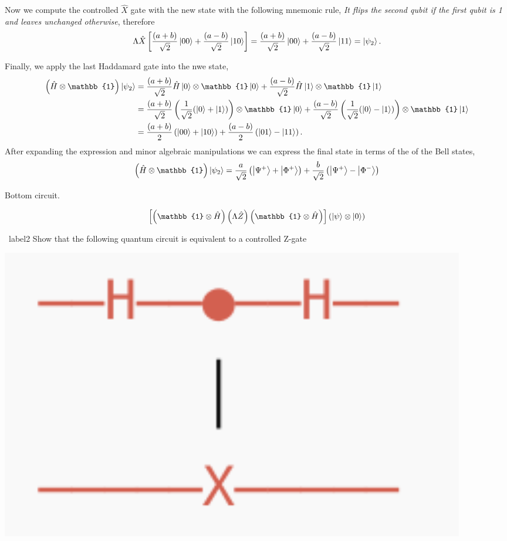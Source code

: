 \documentclass[a4paper]{tufte-handout} %
\begin{document}
Now we compute the controlled $\hat{X}$ gate with the new state with the following mnemonic rule, \textit{It flips the second qubit if the first qubit is \num{1} and leaves unchanged otherwise}, therefore
\begin{gather*}
    \Lambda\hat{X}\left[\frac{\qty(a+b)}{\sqrt{2}}\ket{00}+\frac{\qty(a-b)}{\sqrt{2}}\ket{10}\right] = \frac{\qty(a+b)}{\sqrt{2}}\ket{00}+\frac{\qty(a-b)}{\sqrt{2}}\ket{11}=\ket{\psi_2}.
\end{gather*}

Finally, we apply the last Haddamard gate into the nwe state,
\begin{align*}
    \left(\hat{H}\otimes\mathbb{1}\right)\ket{\psi_2} &=\frac{\qty(a+b)}{\sqrt{2}}\hat{H}\ket{0}\otimes\mathbb{1}\ket{0} + \frac{\qty(a-b)}{\sqrt{2}}\hat{H}\ket{1}\otimes\mathbb{1}\ket{1} \\
                                                      &=\frac{\qty(a+b)}{\sqrt{2}}\left(\frac{1}{\sqrt{2}}\qty(\ket{0}+\ket{1})\right)\otimes\mathbb{1}\ket{0} + \frac{\qty(a-b)}{\sqrt{2}}\left(\frac{1}{\sqrt{2}}\qty(\ket{0}-\ket{1})\right)\otimes\mathbb{1}\ket{1} \\
                                                      &=\frac{\qty(a+b)}{2}\left(\ket{00}+\ket{10}\right) + \frac{\qty(a-b)}{2}\left(\ket{01}-\ket{11}\right).
\end{align*}
After expanding the expression and minor algebraic manipulations we can express the final state in terms of the of the Bell states,
\begin{gather*}
    \left(\hat{H}\otimes\mathbb{1}\right)\ket{\psi_2}=\frac{a}{\sqrt{2}}\left(\ket{\Psi^+} + \ket{\Phi^+} \right) + \frac{b}{\sqrt{2}}\left(\ket{\Psi^+} - \ket{\Phi^-} \right)
\end{gather*}

Bottom circuit.

\begin{align*}
    \left[\left(\mathbb{1}\otimes\hat{H}\right)\left(\Lambda\hat{Z}\right)\left(\mathbb{1}\otimes\hat{H}\right)\right]\left(\ket{\psi}\otimes\ket{0}\right)
\end{align*}



\begin{prob}{~}{label2}
    Show that the following quantum circuit is equivalent to a controlled Z-gate

    \includegraphics[width=0.9\textwidth]{imgs/image-8.png}

\end{prob}
\end{document}

